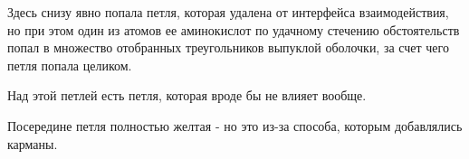 
Здесь снизу явно попала петля, которая удалена от интерфейса взаимодействия, но при этом один из атомов ее аминокислот по удачному стечению обстоятельств попал в множество отобранных треугольников выпуклой оболочки, за счет чего петля попала целиком.

Над этой петлей есть петля, которая вроде бы не влияет вообще. 



Посередине петля полностью желтая - но это из-за способа, которым добавлялись карманы.


